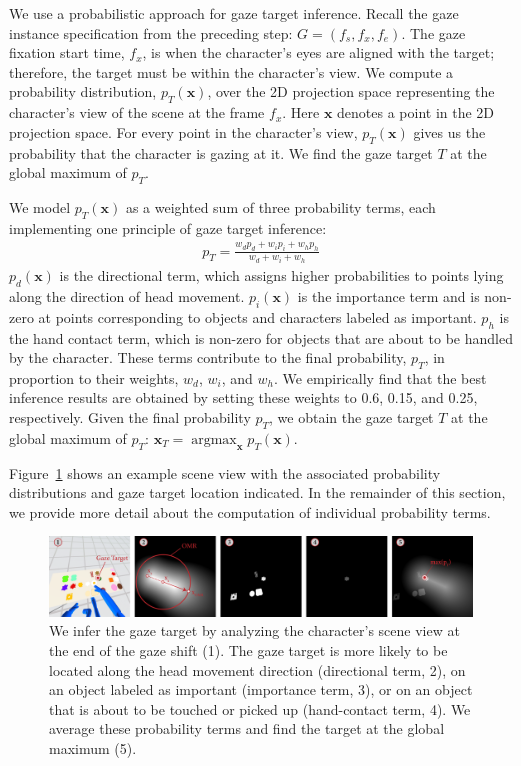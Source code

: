 We use a probabilistic approach for gaze target inference. Recall the gaze instance specification from the preceding step: $G = (f_s, f_x, f_e)$. The gaze fixation start time, $f_x$, is when the character's eyes are aligned with the target; therefore, the target must be within the character's view. We compute a probability distribution, $p_T(\mathbf{x})$, over the 2D projection space representing the character's view of the scene at the frame $f_x$. Here $\mathbf{x}$ denotes a point in the 2D projection space. For every point in the character's view, $p_T(\mathbf{x})$ gives us the probability that the character is gazing at it. We find the gaze target $T$ at the global maximum of $p_T$.

We model $p_T(\mathbf{x})$ as a weighted sum of three probability terms, each implementing one principle of gaze target inference:
%
\begin{align} \label{eq:GazeTargetGlobalProbability}
p_T = \frac{w_d p_d + w_i p_i + w_h p_h}{w_d + w_i + w_h}
\end{align}
%
$p_d(\mathbf{x})$ is the directional term, which assigns higher probabilities to points lying along the direction of head movement. $p_i(\mathbf{x})$ is the importance term and is non-zero at points corresponding to objects and characters labeled as important. $p_h$ is the hand contact term, which is non-zero for objects that are about to be handled by the character. These terms contribute to the final probability, $p_T$, in proportion to their weights, $w_d$, $w_i$, and $w_h$. We empirically find that the best inference results are obtained by setting these weights to 0.6, 0.15, and 0.25, respectively. Given the final probability $p_T$, we obtain the gaze target $T$ at the global maximum of $p_T$: $\mathbf{x}_T = \mathop{argmax}_{\mathbf{x}} p_T(\mathbf{x})$.

Figure~\ref{fig:GazeTargetInference} shows an example scene view with the associated probability distributions and gaze target location indicated. In the remainder of this section, we provide more detail about the computation of individual probability terms.

\begin{figure}
\centering
\includegraphics[width=1\textwidth]{gazeauthoring/Figures/GazeTargetInference.pdf}
\caption{We infer the gaze target by analyzing the character's scene view at the end of the gaze shift (1). The gaze target is more likely to be located along the head movement direction (directional term, 2), on an object labeled as important (importance term, 3), or on an object that is about to be touched or picked up (hand-contact term, 4). We average these probability terms and find the target at the global maximum (5).}
\label{fig:GazeTargetInference}
\end{figure}

